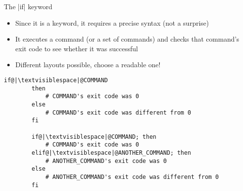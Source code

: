 \begin{frame}[fragile]{The \bash|if| keyword}
    \vspace{-3mm}
    \begin{itemize}
        \item Since it is a keyword, it requires a precise syntax (not a surprise)
        \item It executes a command (or a set of commands) and checks that command's exit code to see whether it was successful
        \item Different layouts possible, choose a readable one!
    \end{itemize}

    \begin{lstlisting}[style=MyBash, numbers=none]
        if@|\textvisiblespace|@COMMAND
        then
            # COMMAND's exit code was 0
        else
            # COMMAND's exit code was different from 0
        fi

        if@|\textvisiblespace|@COMMAND; then
            # COMMAND's exit code was 0
        elif@|\textvisiblespace|@ANOTHER_COMMAND; then
            # ANOTHER_COMMAND's exit code was 0
        else
            # ANOTHER_COMMAND's exit code was different from 0
        fi
    \end{lstlisting}
\end{frame}
